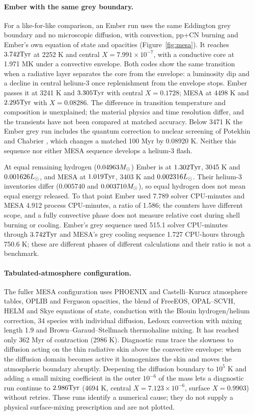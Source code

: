 \paragraph{Ember with the same grey boundary.}
For a like-for-like comparison, an Ember run uses the same Eddington grey
boundary and no microscopic diffusion, with convection, pp+CN burning and
Ember's own equation of state and opacities (Figure~\ref{fig:mesa}). It
reaches $3.742\mathrm{Tyr}$ at 2252 K and central $X=7.991\times10^{-7}$, with a
conductive core at 1.971 MK under a convective envelope. Both codes show the
same transition when a radiative layer separates the core from the envelope:
a luminosity dip and a decline in central helium-3 once replenishment from
the envelope stops. Ember passes it at 3241 K and $3.305\mathrm{Tyr}$ with central
$X=0.1728$; MESA at 4498 K and $2.295\mathrm{Tyr}$ with $X=0.08286$. The difference
in transition temperature and composition is unexplained; the material
physics and time resolution differ, and the transients have not been
compared at matched accuracy. Below 3471 K the Ember grey run includes the
quantum correction to nuclear screening of Potekhin and Chabrier
\cite{potekhin12,chugunov09}, which changes a matched 100 Myr by 0.08920 K.
Neither this sequence nor either MESA sequence develops a helium-3 flash.

At equal remaining hydrogen ($0.04963M_\odot$) Ember is at $1.302\mathrm{Tyr}$,
3045 K and $0.001626L_\odot$, and MESA at $1.019\mathrm{Tyr}$, 3403 K and
$0.002316L_\odot$. Their helium-3 inventories differ ($0.005740$ and
$0.003710M_\odot$), so equal hydrogen does not mean equal energy released. To
that point Ember used 7.789 solver CPU-minutes and MESA 4.912 process
CPU-minutes, a ratio of 1.586; the counters have different scope, and a
fully convective phase does not measure relative cost during shell burning
or cooling. Ember's grey sequence used 515.1 solver CPU-minutes through
$3.742\mathrm{Tyr}$ and MESA's grey cooling sequence 1.727 CPU-hours through
750.6 K; these are different phases of different calculations and their
ratio is not a benchmark.

\paragraph{Tabulated-atmosphere configuration.}
The fuller MESA configuration uses PHOENIX and Castelli--Kurucz atmosphere
tables, OPLIB and Ferguson opacities, the blend of FreeEOS, OPAL--SCVH, HELM and Skye equations of state, conduction with the Blouin hydrogen/helium correction, 34 species with
individual diffusion, Ledoux convection with mixing length 1.9 and
Brown--Garaud--Stellmach thermohaline mixing. It has reached only 362 Myr
of contraction (2986 K). Diagnostic runs trace the slowness to diffusion
acting on the thin radiative skin above the convective envelope: when the
diffusion domain becomes active it homogenizes the skin and moves the
atmospheric boundary abruptly. Deepening the diffusion boundary to $10^5$ K
and adding a small mixing coefficient in the outer $10^{-6}$ of the mass
lets a diagnostic run continue to $2.986\mathrm{Tyr}$ (4694 K, central
$X=7.123\times10^{-6}$, surface $X=0.9903$) without retries. These runs
identify a numerical cause; they do not supply a physical surface-mixing
prescription and are not plotted.

